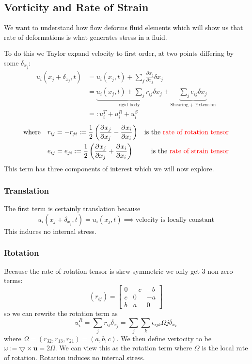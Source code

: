 \documentclass[11pt]{article}
\newcommand*{\pd}[3][]{\ensuremath{\frac{\partial^{#1} {#3}}{\partial {#3}^{#1}}}}
\newcommand{\grad}{\bigtriangledown}
\newcommand{\defeq}{:=}
\newcommand{\eqdef}{=:}
\newcommand{\mv}[1]{\textbf{#1}}
\newcommand{\mdf}[1]{{\color{red}#1}}
\begin{document}
\subsection{Vorticity and Rate of Strain}
We want to understand how flow deforms fluid elements which will show us that rate of deformations is what generates stress in a fluid.

To do this we Taylor expand velocity to first order, at two points differing by some $\delta_{x_j}:$
\begin{align*}
    u_i(x_j+\delta_{x_j},t)&=u_i(x_j,t)+\sum_j \pd{u_i}{x_j}\delta{x_j}\\
    &=\underbrace{u_i(x_j,t)+\sum_j r_{ij}\delta{x_j}}_{\text{rigid body}}+\underbrace{\sum_j e_{ij}\delta{x_j}}_{\text{Shearing + Extension}}\\
    &\eqdef u_i^T + u_i^R + u_i^S
\end{align*}
\begin{align*}
    \text{where} \quad &r_{ij}=-r_{ji}\defeq\frac{1}{2}\left(\pd{u_i}{x_j}-\pd{u_j}{x_i}\right) & \text{is the \mdf{rate of rotation tensor}}\\
    \quad &e_{ij}=e_{ji}\defeq\frac{1}{2}\left(\pd{u_i}{x_j}+\pd{u_j}{x_i}\right) & \text{is the \mdf{rate of strain tensor}}
\end{align*}
This term has three components of interest which we will now explore.
\subsubsection{Translation}
The first term is certainly translation because
$$u_i(x_j+\delta_{x_j},t)=u_i(x_j,t)\implies\text{velocity is locally constant}$$
This induces no internal stress.
\subsubsection{Rotation}
Because the rate of rotation tensor is skew-symmetric we only get 3 non-zero terms:
\[
(r_{ij})=
\begin{bmatrix}
0 & -c & -b\\
c &  0 & -a\\
b &  a &  0
\end{bmatrix}
\]
so we can rewrite the rotation term as
$$u_i^R=\sum_j r_{ij}\delta_{x_j} = \sum_j \sum_k \epsilon_{ijk}\Omega{j}\delta_{x_k}$$
where $\Omega = (r_{32},r_{13},r_{21})=(a,b,c)$.
We then define \mdf{vertocity} to be $\omega\defeq\grad\times\mv{u}=2\Omega$.
We can view this as the rotation term where $\Omega$ is the local rate of rotation. Rotation induces no internal stress.
\end{document}
